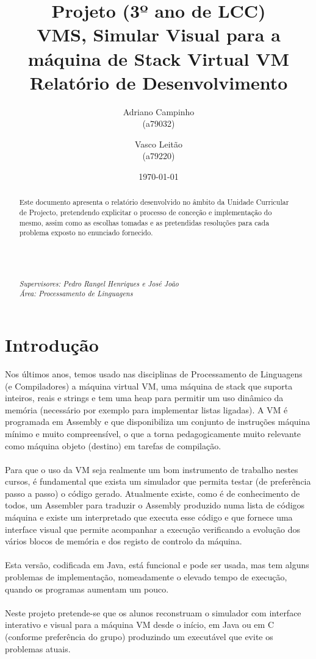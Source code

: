 \documentclass{report}
\title{Projeto (3º ano de LCC)\\ \textbf{VMS, Simular Visual para a máquina de Stack Virtual VM}\\ Relatório de Desenvolvimento}
\author{Adriano Campinho\\ (a79032) \and Vasco Leitão\\ (a79220) }
\date{\today}
\def\supers#1{{\em Supervisores: #1}\\ }
\def\area#1{{\em \'{A}rea: #1}\\[0.2cm]}
\begin{document}
\maketitle
\begin{abstract}
	\quad Este documento apresenta o relatório desenvolvido no âmbito da Unidade Curricular de Projecto, pretendendo
	explicitar o processo de conceção e implementação do mesmo, assim como as escolhas tomadas e as pretendidas resoluções
	para cada problema exposto no enunciado fornecido. \\
	\\
	\\
	\\
  \\
	\supers{Pedro Rangel Henriques e José João}
	\area{Processamento de Linguagens}

\end{abstract}

\tableofcontents

\chapter{Introdução} \label{intro}

\quad Nos últimos anos, temos usado nas disciplinas de Processamento de Linguagens (e
Compiladores) a máquina virtual VM, uma máquina de stack que suporta inteiros, reais e
strings e tem uma heap para permitir um uso dinâmico da memória (necessário por exemplo
para implementar listas ligadas). A VM é programada em Assembly e que disponibiliza um
conjunto de instruções máquina mínimo e muito compreensível, o que a torna
pedagogicamente muito relevante como máquina objeto (destino) em tarefas de compilação.
\\
\\
\quad Para que o uso da VM seja realmente um bom instrumento de trabalho nestes cursos, é
fundamental que exista um simulador que permita testar (de preferência passo a passo) o
código gerado. Atualmente existe, como é de conhecimento de todos, um Assembler para
traduzir o Assembly produzido numa lista de códigos máquina e existe um interpretado que
executa esse código e que fornece uma interface visual que permite acompanhar a execução
verificando a evolução dos vários blocos de memória e dos registo de controlo da máquina.
\\
\\
\quad Esta versão, codificada em Java, está funcional e pode ser usada, mas tem alguns problemas de
implementação, nomeadamente o elevado tempo de execução, quando os programas
aumentam um pouco.
\\
\\
\quad Neste projeto pretende-se que os alunos reconstruam o simulador com interface interativo e
visual para a máquina VM desde o início, em Java ou em C (conforme preferência do grupo)
produzindo um executável que evite os problemas atuais.
\end{document}
